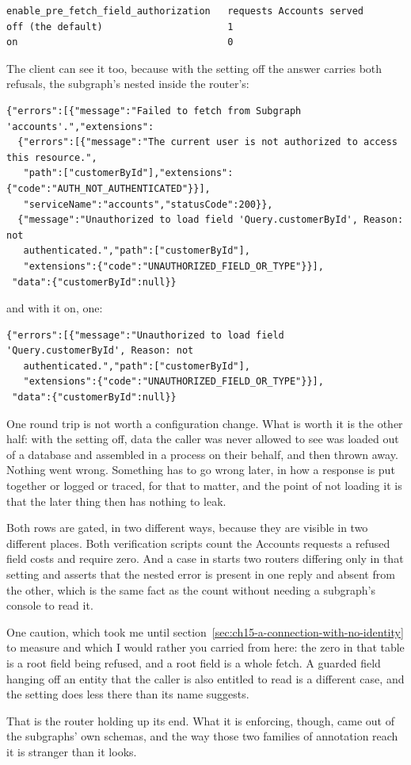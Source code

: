 \begin{verbatim}
enable_pre_fetch_field_authorization   requests Accounts served
off (the default)                      1
on                                     0
\end{verbatim}

The client can see it too, because with the setting off the answer carries both
refusals, the subgraph's nested inside the router's:

\begin{verbatim}
{"errors":[{"message":"Failed to fetch from Subgraph 'accounts'.","extensions":
  {"errors":[{"message":"The current user is not authorized to access this resource.",
   "path":["customerById"],"extensions":{"code":"AUTH_NOT_AUTHENTICATED"}}],
   "serviceName":"accounts","statusCode":200}},
  {"message":"Unauthorized to load field 'Query.customerById', Reason: not
   authenticated.","path":["customerById"],
   "extensions":{"code":"UNAUTHORIZED_FIELD_OR_TYPE"}}],
 "data":{"customerById":null}}
\end{verbatim}

and with it on, one:

\begin{verbatim}
{"errors":[{"message":"Unauthorized to load field 'Query.customerById', Reason: not
   authenticated.","path":["customerById"],
   "extensions":{"code":"UNAUTHORIZED_FIELD_OR_TYPE"}}],
 "data":{"customerById":null}}
\end{verbatim}

One round trip is not worth a configuration change. What is worth it is the
other half: with the setting off, data the caller was never allowed to see was
loaded out of a database and assembled in a process on their behalf, and then
thrown away. Nothing went wrong. Something has to go wrong later, in how a
response is put together or logged or traced, for that to matter, and the point
of not loading it is that the later thing then has nothing to leak.

Both rows are gated, in two different ways, because they are visible in two
different places. Both verification scripts count the Accounts requests a
refused field costs and require zero. And a case in
 starts two routers differing only in that
setting and asserts that the nested  error is present in one
reply and absent from the other, which is the same fact as the count without
needing a subgraph's console to read it.

One caution, which took me until
section~\ref{sec:ch15-a-connection-with-no-identity} to measure and which I
would rather you carried from here: the zero in that table is a root field being
refused, and a root field is a whole fetch. A guarded field hanging off an
entity that the caller is also entitled to read is a different case, and the
setting does less there than its name suggests.

\medskip
That is the router holding up its end. What it is enforcing, though, came out of
the subgraphs' own schemas, and the way those two families of annotation reach
it is stranger than it looks.

%
